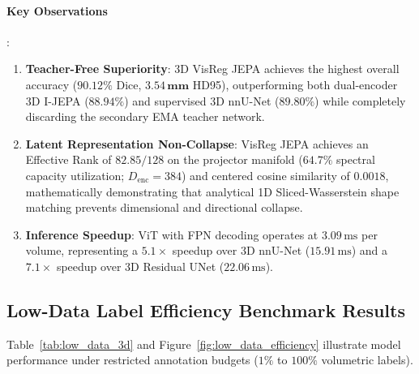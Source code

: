 \documentclass{article}
\begin{document}
\paragraph{Key Observations}:
\begin{enumerate}
    \item \textbf{Teacher-Free Superiority}: 3D VisReg JEPA achieves the highest overall accuracy ($\mathbf{90.12\%}$ Dice, $\mathbf{3.54\,\text{mm}}$ HD95), outperforming both dual-encoder 3D I-JEPA ($88.94\%$) and supervised 3D nnU-Net ($89.80\%$) while completely discarding the secondary EMA teacher network.
    \item \textbf{Latent Representation Non-Collapse}: VisReg JEPA achieves an Effective Rank of $82.85 / 128$ on the projector manifold ($64.7\%$ spectral capacity utilization; $D_{\text{enc}}=384$) and centered cosine similarity of $0.0018$, mathematically demonstrating that analytical 1D Sliced-Wasserstein shape matching prevents dimensional and directional collapse.
    \item \textbf{Inference Speedup}: ViT with FPN decoding operates at $3.09\,\text{ms}$ per volume, representing a $\mathbf{5.1\times}$ speedup over 3D nnU-Net ($15.91\,\text{ms}$) and a $\mathbf{7.1\times}$ speedup over 3D Residual UNet ($22.06\,\text{ms}$).
\end{enumerate}

\subsection{Low-Data Label Efficiency Benchmark Results}

Table~\ref{tab:low_data_3d} and Figure~\ref{fig:low_data_efficiency} illustrate model performance under restricted annotation budgets ($1\%$ to $100\%$ volumetric labels).
\end{document}
